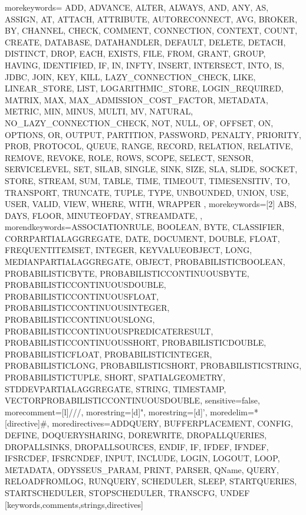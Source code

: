 %
   {morekeywords={%
ADD, ADVANCE, ALTER, ALWAYS, AND, ANY, AS, ASSIGN, AT, ATTACH, ATTRIBUTE, AUTORECONNECT, AVG, BROKER, BY, CHANNEL, CHECK, COMMENT, CONNECTION, CONTEXT, COUNT, CREATE, DATABASE, DATAHANDLER, DEFAULT, DELETE, DETACH, DISTINCT, DROP, EACH, EXISTS, FILE, FROM, GRANT, GROUP, HAVING, IDENTIFIED, IF, IN, INFTY, INSERT, INTERSECT, INTO, IS, JDBC, JOIN, KEY, KILL, LAZY_CONNECTION_CHECK, LIKE, LINEAR_STORE, LIST, LOGARITHMIC_STORE, LOGIN_REQUIRED, MATRIX, MAX, MAX_ADMISSION_COST_FACTOR, METADATA, METRIC, MIN, MINUS, MULTI, MV, NATURAL, NO_LAZY_CONNECTION_CHECK, NOT, NULL, OF, OFFSET, ON, OPTIONS, OR, OUTPUT, PARTITION, PASSWORD, PENALTY, PRIORITY, PROB, PROTOCOL, QUEUE, RANGE, RECORD, RELATION, RELATIVE, REMOVE, REVOKE, ROLE, ROWS, SCOPE, SELECT, SENSOR, SERVICELEVEL, SET, SILAB, SINGLE, SINK, SIZE, SLA, SLIDE, SOCKET, STORE, STREAM, SUM, TABLE, TIME, TIMEOUT, TIMESENSITIV, TO, TRANSPORT, TRUNCATE, TUPLE, TYPE, UNBOUNDED, UNION, USE, USER, VALID, VIEW, WHERE, WITH, WRAPPER%
      },%
   morekeywords=[2]{%
      ABS,%
      DAYS,%
      FLOOR,%
      MINUTEOFDAY,%
      STREAMDATE,%
   },%
   morendkeywords={ASSOCIATIONRULE, BOOLEAN, BYTE, CLASSIFIER, CORRPARTIALAGGREGATE, DATE, DOCUMENT, DOUBLE, FLOAT, FREQUENTITEMSET, INTEGER, KEYVALUEOBJECT, LONG, MEDIANPARTIALAGGREGATE, OBJECT, PROBABILISTICBOOLEAN, PROBABILISTICBYTE, PROBABILISTICCONTINUOUSBYTE, PROBABILISTICCONTINUOUSDOUBLE, PROBABILISTICCONTINUOUSFLOAT, PROBABILISTICCONTINUOUSINTEGER, PROBABILISTICCONTINUOUSLONG, PROBABILISTICCONTINUOUSPREDICATERESULT, PROBABILISTICCONTINUOUSSHORT, PROBABILISTICDOUBLE, PROBABILISTICFLOAT, PROBABILISTICINTEGER, PROBABILISTICLONG, PROBABILISTICSHORT, PROBABILISTICSTRING, PROBABILISTICTUPLE, SHORT, SPATIALGEOMETRY, STDDEVPARTIALAGGREGATE, STRING, TIMESTAMP, VECTORPROBABILISTICCONTINUOUSDOUBLE},%
   sensitive=false,
   morecomment=[l]///,%
   morestring=[d]",%
   morestring=[d]',%
   moredelim=*[directive]\#,%
   moredirectives={ADDQUERY, BUFFERPLACEMENT, CONFIG, DEFINE, DOQUERYSHARING, DOREWRITE, DROPALLQUERIES, DROPALLSINKS, DROPALLSOURCES, ENDIF, IF, IFDEF, IFNDEF, IFSRCDEF, IFSRCNDEF, INPUT, INCLUDE, LOGIN, LOGOUT, LOOP, METADATA, ODYSSEUS_PARAM, PRINT, PARSER, QName, QUERY, RELOADFROMLOG, RUNQUERY, SCHEDULER, SLEEP, STARTQUERIES, STARTSCHEDULER, STOPSCHEDULER, TRANSCFG, UNDEF}%
}[keywords,comments,strings,directives]

